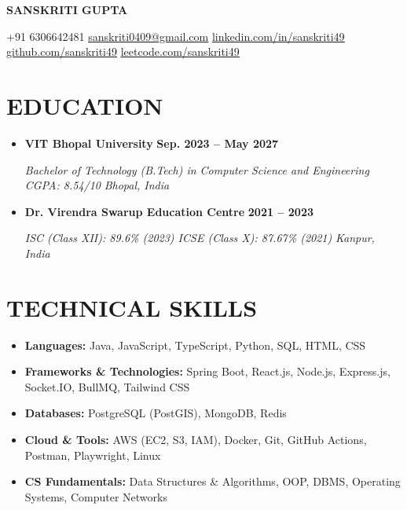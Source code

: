 \documentclass[letterpaper,11pt]{article}
\newcommand{\resumeLink}[2]{\href{#1}{\underline{#2}}}
\newcommand{\resumeSubheading}[4]{%
  \item
  \textbf{#1} \hfill {\small #2}\par
  {\small\textit{#3} \hfill \textit{#4}}\par
}
\newcommand{\resumeSubHeadingListStart}{%
  \begin{itemize}[leftmargin=0pt,label={},itemsep=2.5pt,topsep=0pt,parsep=0pt,partopsep=0pt]
}
\newcommand{\resumeSubHeadingListEnd}{\end{itemize}}
\begin{document}
\begin{center}
  {\fontsize{20pt}{23pt}\selectfont\bfseries SANSKRITI GUPTA}\par
  \vspace{2.5pt}
  {\small
  +91 6306642481 \quad \textbar{} \quad
  \resumeLink{mailto:sanskriti0409@gmail.com}{sanskriti0409@gmail.com} \quad \textbar{} \quad
  \resumeLink{https://linkedin.com/in/sanskriti49}{linkedin.com/in/sanskriti49} \quad \textbar{} \quad
  \resumeLink{https://github.com/sanskriti49}{github.com/sanskriti49} \quad \textbar{} \quad
  \resumeLink{https://leetcode.com/u/sanskriti49}{leetcode.com/sanskriti49}\par
  }
\end{center}
\vspace{-4pt}

\section{EDUCATION}
\resumeSubHeadingListStart
  \resumeSubheading
    {VIT Bhopal University}{\textbf{Sep. 2023 -- May 2027}}
    {Bachelor of Technology (B.Tech) in Computer Science and Engineering \textbar{} CGPA: 8.54/10}{Bhopal, India}
  \resumeSubheading
    {Dr. Virendra Swarup Education Centre}{\textbf{2021 -- 2023}}
    {ISC (Class XII): 89.6\% (2023) \textbar{} ICSE (Class X): 87.67\% (2021)}{Kanpur, India}
\resumeSubHeadingListEnd

\section{TECHNICAL SKILLS}
{\small
\begin{itemize}[leftmargin=0pt,label={},itemsep=1.2pt,topsep=1pt,parsep=0pt,partopsep=0pt]
  \item \textbf{Languages:} Java, JavaScript, TypeScript, Python, SQL, HTML, CSS
  \item \textbf{Frameworks \& Technologies:} Spring Boot, React.js, Node.js, Express.js, Socket.IO, BullMQ, Tailwind CSS
  \item \textbf{Databases:} PostgreSQL (PostGIS), MongoDB, Redis
  \item \textbf{Cloud \& Tools:} AWS (EC2, S3, IAM), Docker, Git, GitHub Actions, Postman, Playwright, Linux
  \item \textbf{CS Fundamentals:} Data Structures \& Algorithms, OOP, DBMS, Operating Systems, Computer Networks
\end{itemize}
}
\end{document}
